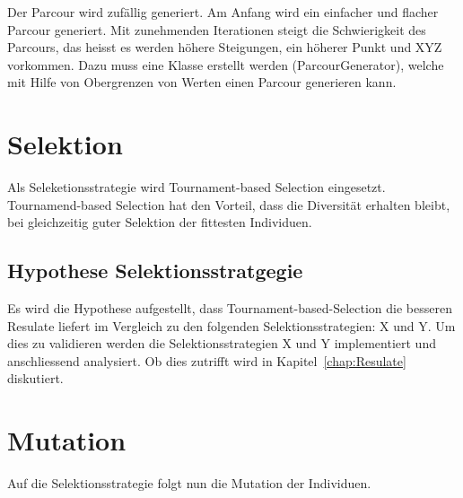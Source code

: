     Der Parcour wird zufällig generiert. Am Anfang wird ein einfacher und flacher Parcour generiert.
    Mit zunehmenden Iterationen steigt die Schwierigkeit des Parcours, das heisst es werden höhere Steigungen, ein höherer Punkt und XYZ vorkommen.
    Dazu muss eine Klasse erstellt werden (ParcourGenerator), welche mit Hilfe von Obergrenzen von Werten einen Parcour generieren kann.

  \section{Selektion\label{sec:Selektion}}

    Als Seleketionsstrategie wird Tournament-based Selection eingesetzt. Tournamend-based Selection hat den Vorteil,
    dass die Diversität erhalten bleibt, bei gleichzeitig guter Selektion der fittesten Individuen.

    \subsection{Hypothese Selektionsstratgegie\label{sub:Hypothese Selektionsstratgegie}}

      Es wird die Hypothese aufgestellt, dass Tournament-based-Selection die besseren Resulate liefert im Vergleich zu den folgenden Selektionsstrategien: X und Y.
      Um dies zu validieren werden die Selektionsstrategien X und Y implementiert und anschliessend analysiert.
      Ob dies zutrifft wird in Kapitel~\ref{chap:Resulate} diskutiert.

  \section{Mutation\label{sec:Mutation}}

    Auf die Selektionsstrategie folgt nun die Mutation der Individuen.
